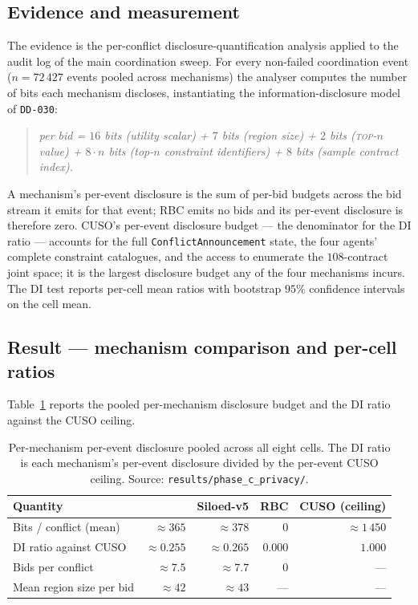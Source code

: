 \subsection*{Evidence and measurement}

The evidence is the per-conflict disclosure-quantification analysis
applied to the audit log of the main coordination sweep. For every
non-failed coordination event ($n = 72\,427$ events pooled across
mechanisms) the analyser computes the number of bits each mechanism
discloses, instantiating the information-disclosure model of
\texttt{DD-030}:

\begin{quote}
\itshape
per bid \;=\; $16$ bits (utility scalar) \;+\; $7$ bits (region size)
\;+\; $2$ bits (\textsc{top}-$n$ value) \;+\;
$8\!\cdot\!n$ bits (top-$n$ constraint identifiers) \;+\; $8$ bits
(sample contract index).
\end{quote}

A mechanism's per-event disclosure is the sum of per-bid budgets
across the bid stream it emits for that event; RBC emits no bids
and its per-event disclosure is therefore zero. CUSO's per-event
disclosure budget --- the denominator for the DI ratio --- accounts
for the full \texttt{ConflictAnnouncement} state, the four agents'
complete constraint catalogues, and the access to enumerate the
$108$-contract joint space; it is the largest disclosure budget any
of the four mechanisms incurs. The DI test reports per-cell mean
ratios with bootstrap $95\%$ confidence intervals on the cell mean.

\subsection*{Result --- mechanism comparison and per-cell ratios}

Table~\ref{tab:val-disclosure-pool} reports the pooled per-mechanism
disclosure budget and the DI ratio against the CUSO ceiling.

\begin{table}[ht]
\centering
\caption{Per-mechanism per-event disclosure pooled across all eight
cells. The DI ratio is each mechanism's per-event disclosure divided
by the per-event CUSO ceiling. Source:
\texttt{results/phase\_c\_privacy/}.}
\label{tab:val-disclosure-pool}
\small
\begin{tabularx}{\textwidth}{@{}X r r r r@{}}
\toprule
\textbf{Quantity} & \textbf{\NEXUS{}} & \textbf{Siloed-v5}
                  & \textbf{RBC} & \textbf{CUSO (ceiling)} \\
\midrule
Bits / conflict (mean)              & $\approx 365$ & $\approx 378$ & $0$ & $\approx 1\,450$ \\
DI ratio against CUSO               & $\approx 0.255$ & $\approx 0.265$ & $0.000$ & $1.000$ \\
Bids per conflict                    & $\approx 7.5$  & $\approx 7.7$  & $0$ & --- \\
Mean region size per bid             & $\approx 42$    & $\approx 43$    & --- & --- \\
\bottomrule
\end{tabularx}
\end{table}


